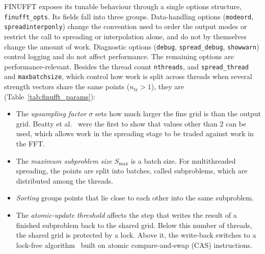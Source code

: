 FINUFFT exposes its tunable behaviour through a single options structure,
\texttt{finufft\_opts}. Its fields fall into three groups. Data-handling
options (\texttt{modeord}, \texttt{spreadinterponly}) change the convention
used to order the output modes or restrict the call to spreading or
interpolation alone, and do not by themselves change the amount of work.
Diagnostic options (\texttt{debug}, \texttt{spread\_debug},
\texttt{showwarn}) control logging and do not affect performance. The
remaining options are performance-relevant. Besides the thread count
\texttt{nthreads}, and \texttt{spread\_thread} and \texttt{maxbatchsize},
which control how work is split across threads when several strength vectors
share the same points ($n_{\mathrm{tr}} > 1$), they are
(Table~\ref{tab:finufft_params}):
\begin{itemize}
    \item The \emph{upsampling factor} $\sigma$ sets how much larger the fine
    grid is than the output grid. Beatty et al.~\cite{beatty2005} were the first
    to show that values other than $2$ can be used, which allows work in the
    spreading stage to be traded against work in the FFT.
    \item The \emph{maximum subproblem size} $S_{\max}$ is a batch size. For
    multithreaded spreading, the points are split into batches, called
    subproblems, which are distributed among the threads.
    \item \emph{Sorting} groups points that lie close to each other into the
    same subproblem.
    \item The \emph{atomic-update threshold} affects the step that writes the
    result of a finished subproblem back to the shared grid. Below this number
    of threads, the shared grid is protected by a lock. Above it, the write-back
    switches to a lock-free algorithm~\cite{herlihyshavit2012} built on atomic
    compare-and-swap (CAS) instructions.
\end{itemize}

